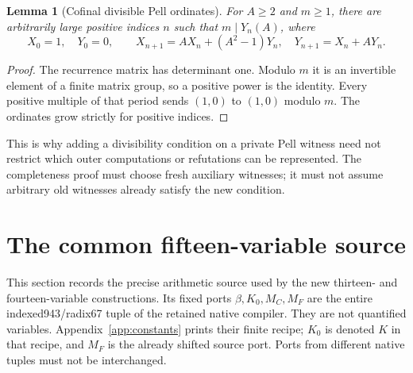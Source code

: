 \documentclass[11pt,letterpaper]{article}
\newtheorem{lemma}[theorem]{Lemma}
\theoremstyle{remark}\newtheorem{remark}[theorem]{Remark}
\begin{document}
\begin{lemma}[Cofinal divisible Pell ordinates]\label{lem:period}
For $A\ge2$ and $m\ge1$, there are arbitrarily large positive indices $n$
such that $m\mid Y_n(A)$, where
\[
X_0=1,\quad Y_0=0,\qquad
X_{n+1}=AX_n+(A^2-1)Y_n,\quad Y_{n+1}=X_n+AY_n.
\]
\end{lemma}
\begin{proof}
The recurrence matrix has determinant one. Modulo $m$ it is an invertible
element of a finite matrix group, so a positive power is the identity.
Every positive multiple of that period sends $(1,0)$ to $(1,0)$ modulo $m$.
The ordinates grow strictly for positive indices.
\end{proof}
This is why adding a divisibility condition on a private Pell witness need
not restrict which outer computations or refutations can be represented.
The completeness proof must choose fresh auxiliary witnesses; it must not
assume arbitrary old witnesses already satisfy the new condition.

\section{The common fifteen-variable source}
\label{sec:source}

This section records the precise arithmetic source used by the new
thirteen- and fourteen-variable constructions. Its fixed ports
$\beta,K_0,M_C,M_F$ are the entire indexed943/radix67 tuple of the retained
native compiler. They are not quantified variables. Appendix~\ref{app:constants}
prints their finite recipe; $K_0$ is denoted $K$ in that recipe, and $M_F$ is
the already shifted source port. Ports from different native tuples must not
be interchanged.
\end{document}
